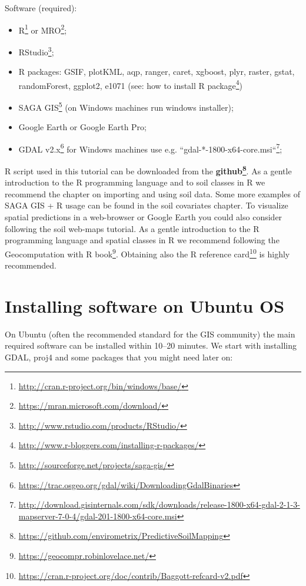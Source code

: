 \documentclass[graybox,natbib,nospthms,UStrade]{svmono}
\renewcommand{\href}[2]{#2 (\url{#1})}
\renewcommand{\href}[2]{#2\footnote{\url{#1}}}
\begin{document}
Software (required):

\begin{itemize}
\item
  \href{http://cran.r-project.org/bin/windows/base/}{R} or \href{https://mran.microsoft.com/download/}{MRO};
\item
  \href{http://www.rstudio.com/products/RStudio/}{RStudio};
\item
  R packages: GSIF, plotKML, aqp, ranger, caret, xgboost, plyr, raster, gstat, randomForest, ggplot2, e1071 (see: \href{http://www.r-bloggers.com/installing-r-packages/}{how to install R package})
\item
  \href{http://sourceforge.net/projects/saga-gis/}{SAGA GIS} (on Windows machines run windows installer);
\item
  Google Earth or Google Earth Pro;
\item
  \href{https://trac.osgeo.org/gdal/wiki/DownloadingGdalBinaries}{GDAL v2.x} for Windows machines use e.g. \href{http://download.gisinternals.com/sdk/downloads/release-1800-x64-gdal-2-1-3-mapserver-7-0-4/gdal-201-1800-x64-core.msi}{``gdal-*-1800-x64-core.msi``};
\end{itemize}

R script used in this tutorial can be downloaded from the \textbf{\href{https://github.com/envirometrix/PredictiveSoilMapping}{github}}. As a gentle introduction to the R programming language and to soil classes in R we recommend the chapter on importing and using soil data. Some more examples of SAGA GIS + R usage can be found in the soil covariates chapter. To visualize spatial predictions in a web-browser or Google Earth you could also consider following the soil web-maps tutorial. As a gentle introduction to the R programming language and spatial classes in R we recommend following \href{https://geocompr.robinlovelace.net/}{the Geocomputation with R book}. Obtaining also the \href{https://cran.r-project.org/doc/contrib/Baggott-refcard-v2.pdf}{R reference card} is highly recommended.

\hypertarget{installing-software-on-ubuntu-os}{%
\section{Installing software on Ubuntu OS}\label{installing-software-on-ubuntu-os}}

On Ubuntu (often the recommended standard for the GIS community) the main required software can be installed within 10--20 minutes. We start with installing GDAL, proj4 and some packages that you might need later on:
\end{document}
